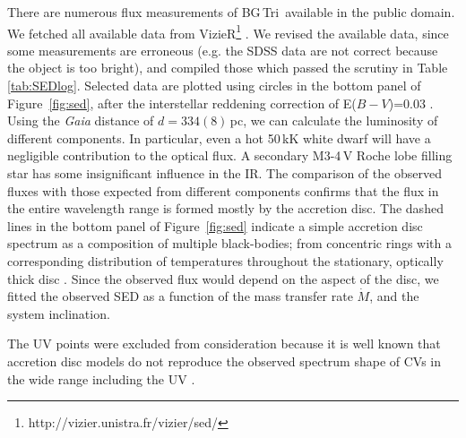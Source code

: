 \documentclass[fleqn,usenatbib]{mnras}
\def\bg{BG\,Tri}
\def\mdot{$\dot M$}
\begin{document}
 There are numerous flux measurements of \bg\ available  in the public domain. We fetched all available data from
 VizieR\footnote{http://vizier.unistra.fr/vizier/sed/} \citep{2000A&AS..143...23O}.
 We revised the available data, since some measurements are erroneous  (e.g. the SDSS data are not correct because the object is too bright),
 and  compiled those which passed the scrutiny in Table\,\ref{tab:SEDlog}. 
Selected data are plotted using  circles in the bottom panel of Figure~\ref{fig:sed}, after the interstellar reddening correction
of E($B-V$)=0.03 \citep{2015ApJ...810...25G}.
%
Using the  {\it Gaia} distance of $d= 334(8)$\,pc, we can calculate the luminosity of different components.
In particular, even a hot 50\,kK white dwarf will have a negligible contribution to the optical flux. A secondary M3-4\,V Roche lobe filling
star has some insignificant influence in the IR. The comparison of the observed fluxes with those expected from different components confirms that
the flux in the entire wavelength range  is formed mostly by the accretion disc.  
The dashed lines in the bottom panel of Figure~\ref{fig:sed} indicate a simple accretion disc spectrum as a composition of multiple
black-bodies; from concentric rings with a corresponding distribution of temperatures throughout the stationary, optically thick disc
\citep{1989A&A...211..131L}. Since the observed flux would depend on the aspect of the disc, we fitted the observed SED as a function of the
mass transfer rate \mdot, and  the system inclination.

The UV points were excluded from consideration because  it is well known that accretion disc models do not reproduce  the observed spectrum
shape of CVs in the wide range including the UV \citep{2007AJ....134.1923P}. 
\end{document}

